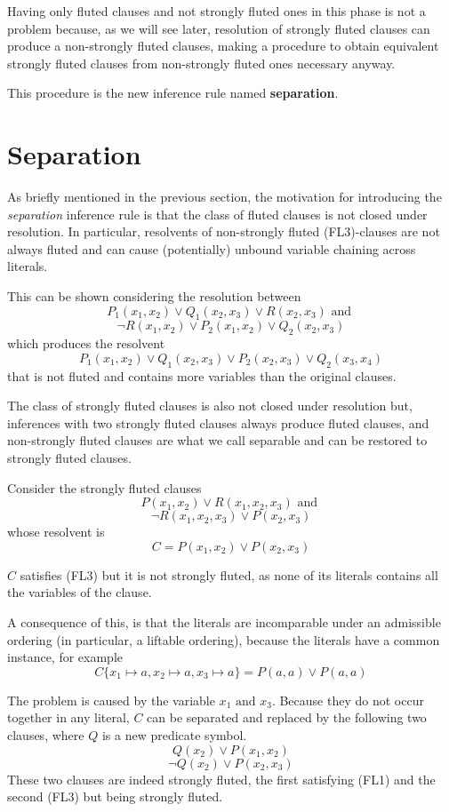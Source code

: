 Having only fluted clauses and not strongly fluted ones in this phase is not a problem because, as we will see later, resolution of strongly fluted clauses can produce a non-strongly fluted clauses, making a procedure to obtain equivalent strongly fluted clauses from non-strongly fluted ones necessary anyway.

This procedure is the new inference rule named \textbf{separation}.
\section{Separation}
As briefly mentioned in the previous section, the motivation for introducing the \emph{separation} inference rule is that the class of fluted clauses is not closed under resolution.
In particular, resolvents of non-strongly fluted (FL3)-clauses are not always fluted and can cause (potentially) unbound variable chaining across literals.

This can be shown considering the resolution between
  \[
    P_1(x_1,x_2) \lor Q_1(x_2,x_3) \lor R(x_2,x_3) \text{ and }
  \]
  \[
  \neg R(x_1,x_2) \lor P_2(x_1,x_2) \lor Q_2(x_2,x_3)
  \]
which produces the resolvent
  \[
    P_1(x_1,x_2) \lor Q_1(x_2,x_3) \lor P_2(x_2,x_3) \lor Q_2(x_3,x_4)
  \]
that is not fluted and contains more variables than the original clauses.

The class of strongly fluted clauses is also not closed under resolution but, inferences with two strongly fluted clauses always produce fluted clauses, and non-strongly fluted clauses are what we call separable and can be restored to strongly fluted clauses.

Consider the strongly fluted clauses
  \[
    P(x_1,x_2) \lor R(x_1,x_2,x_3) \text{ and }
  \]
  \[
  \neg R(x_1,x_2,x_3) \lor P(x_2,x_3)
  \]
whose resolvent is
  \[
    C = P(x_1,x_2) \lor P(x_2,x_3)
  \]

\(C\) satisfies (FL3) but it is not strongly fluted, as none of its literals contains all the variables of the clause.

A consequence of this, is that the literals are incomparable under an admissible ordering (in particular, a liftable ordering), because the literals have a common instance, for example
  \[
    C\{x_1 \mapsto a, x_2 \mapsto a, x_3 \mapsto a\} = P(a,a) \lor P(a,a)
  \]

The problem is caused by the variable \(x_1 \text{ and } x_3\). Because they do not occur together in any literal, \(C\) can be separated and replaced by the following two clauses, where \(Q\) is a new predicate symbol.
  \[
    Q(x_2) \lor P(x_1,x_2)
  \]
  \[
    \neg Q(x_2) \lor P(x_2,x_3)
  \]
These two clauses are indeed strongly fluted, the first satisfying (FL1) and the second (FL3) but being strongly fluted.

